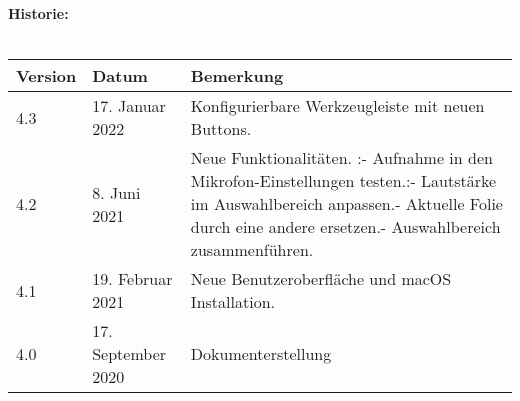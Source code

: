 \textbf{Historie:}
\\\\
\makeatletter
\begin{tabularx}{\textwidth}{llX} \toprule
	\textbf{Version}	& \textbf{Datum}		& \textbf{Bemerkung}		\\ \midrule
	4.3					& 17. Januar 2022		& Konfigurierbare Werkzeugleiste mit neuen Buttons.	\\
	4.2					& 8. Juni 2021			& Neue Funktionalitäten. \newline\newline \lectPresenter:\newline - Aufnahme in den Mikrofon-Einstellungen testen.\newline\newline \lectEditor:\newline - Lautstärke im Auswahlbereich anpassen.\newline - Aktuelle Folie durch eine andere ersetzen.\newline - Auswahlbereich zusammenführen.	\\
	4.1					& 19. Februar 2021		& Neue Benutzeroberfläche und macOS Installation.	\\
	4.0					& 17. September 2020	& Dokumenterstellung		\\ \bottomrule
	\hline
\end{tabularx}
\makeatother
